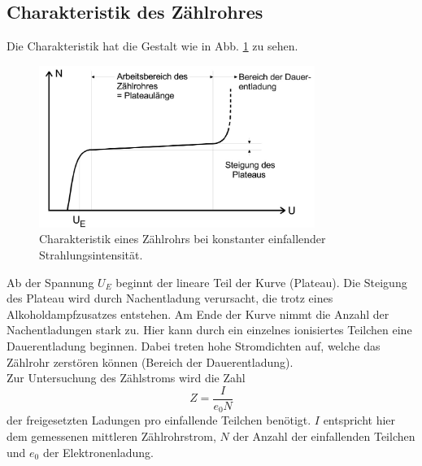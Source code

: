 \subsection{Charakteristik des Zählrohres}
Die Charakteristik hat die Gestalt wie in Abb. \ref{fig:charakteristik} zu sehen.
\begin{figure}
    \centering
    \includegraphics[width=0.8\textwidth]{content/data/charakteristik.jpg}
    \caption{Charakteristik eines Zählrohrs bei konstanter einfallender Strahlungsintensität. \cite[5]{anleitung}}
    \label{fig:charakteristik}
\end{figure}
Ab der Spannung $U_E$ beginnt der lineare Teil der Kurve (Plateau).
Die Steigung des Plateau wird durch Nachentladung verursacht, die trotz eines Alkoholdampfzusatzes entstehen.
Am Ende der Kurve nimmt die Anzahl der Nachentladungen stark zu.
Hier kann durch ein einzelnes ionisiertes Teilchen eine Dauerentladung beginnen.
Dabei treten hohe Stromdichten auf, welche das Zählrohr zerstören können (Bereich der Dauerentladung).
\\
Zur Untersuchung des Zählstroms wird die Zahl
\begin{equation}
    Z = \frac{I}{e_0 N}
    \label{eqn:Z}
\end{equation}
der freigesetzten Ladungen pro einfallende Teilchen benötigt.
$I$ entspricht hier dem gemessenen mittleren Zählrohrstrom, $N$ der Anzahl der einfallenden Teilchen und $e_0$ der Elektronenladung.